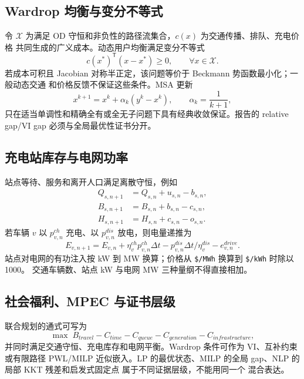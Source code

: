 \subsection{Wardrop 均衡与变分不等式}
令 $\mathcal X$ 为满足 OD 守恒和非负性的路径流集合，$c(x)$ 为交通传播、排队、充电价格
共同生成的广义成本。动态用户均衡满足变分不等式
\begin{equation}
 c(x^*)^\mathsf T(x-x^*)\ge0,\qquad \forall x\in\mathcal X.
\end{equation}
若成本可积且 Jacobian 对称半正定，该问题等价于 Beckmann 势函数最小化；一般动态交通
和价格反馈不保证这些条件。MSA 更新
\begin{equation}
 x^{k+1}=x^k+\alpha_k(y^k-x^k),\qquad \alpha_k=\frac1{k+1},
\end{equation}
只在适当单调性和精确全有或全无子问题下具有经典收敛保证。报告的 relative gap/VI gap
必须与全局最优性证书分开。

\subsection{充电站库存与电网功率}
站点等待、服务和离开人口满足离散守恒，例如
\begin{align}
 Q_{s,n+1}&=Q_{s,n}+u_{s,n}-b_{s,n},\\
 B_{s,n+1}&=B_{s,n}+b_{s,n}-c_{s,n},\\
 H_{s,n+1}&=H_{s,n}+c_{s,n}-o_{s,n}.
\end{align}
若车辆 $v$ 以 $p_{v,n}^{ch}$ 充电、以 $p_{v,n}^{dis}$ 放电，则电量递推为
\begin{equation}
 E_{v,n+1}=E_{v,n}+\eta_v^{ch}p_{v,n}^{ch}\Delta t
 -p_{v,n}^{dis}\Delta t/\eta_v^{dis}-e_{v,n}^{drive}.
\end{equation}
站点对电网的有功注入按 kW 到 MW 换算；价格从 \texttt{\$/MWh} 换算到
\texttt{\$/kWh} 时除以 1000。
交通车辆数、站点 kW 与电网 MW 三种量纲不得直接相加。

\subsection{社会福利、MPEC 与证书层级}
联合规划的通式可写为
\begin{equation}
 \max\;B_{travel}-C_{time}-C_{queue}-C_{generation}-C_{infrastructure},
\end{equation}
并同时满足交通守恒、充电库存和电网平衡。Wardrop 条件可作为 VI、互补约束或有限路径
PWL/MILP 近似嵌入。LP 的最优状态、MILP 的全局 gap、NLP 的局部 KKT 残差和启发式固定点
属于不同证据层级，不能用同一个  混合表达。

